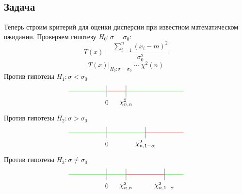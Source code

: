 \documentclass[12pt, a4paper]{article}
\begin{document}
\subsection*{Задача}
Теперь строим критерий для оценки дисперсии при известном математическом ожидании. Проверяем гипотезу $H_0: \sigma = \sigma_0$:
\[T(x) = \frac{\sum_{i = 1}^{n} (x_i - m)^2}{\sigma_0^2}\]
\[T(x) \big|_{H_0: \sigma = \sigma_0} \sim \chi^2(n)\]
Против гипотезы $H_1: \sigma < \sigma_0$
\[\begin{tikzpicture}[scale=2]
    \draw[green] (-1, 0) -- (0, 0);
    \draw[red] (0, 0) -- (0.5, 0);
    \draw[green] (0.5, 0) -- (2, 0);
    \draw (0, -0.15) -- ++(0, 0.3);
    \node at (0, -0.3) (a) {$0$};
    \draw (0.5, -0.15) -- ++(0, 0.3);
    \node at (0.5, -0.3) (a) {$\chi^2_{n, \alpha}$};
\end{tikzpicture}\]
Против гипотезы $H_2: \sigma > \sigma_0$
\[\begin{tikzpicture}[scale=2]
    \draw[green] (-1, 0) -- (0, 0);
    \draw[green] (0, 0) -- (1, 0);
    \draw[red] (1, 0) -- (2, 0);
    \draw (0, -0.15) -- ++(0, 0.3);
    \node at (0, -0.3) (a) {$0$};
    \draw (1, -0.15) -- ++(0, 0.3);
    \node at (1, -0.3) (a) {$\chi^2_{n, 1 - \alpha}$};
\end{tikzpicture}\]
Против гипотезы $H_3: \sigma \neq \sigma_0$
\[\begin{tikzpicture}[scale=2]
    \draw[green] (-1, 0) -- (0, 0);
    \draw[green] (0, 0) -- (0.5, 0);
    \draw[green] (1.5, 0) -- ++(0.5, 0);
    \draw[red] (0.5, 0) -- (1.5, 0);
    \draw (0, -0.15) -- ++(0, 0.3);
    \node at (0, -0.3) (a) {$0$};
    \draw (0.5, -0.15) -- ++(0, 0.3);
    \draw (1.5, -0.15) -- ++(0, 0.3);
    \node at (0.5, -0.3) (a) {$\chi^2_{n, \alpha}$};
    \node at (1.5, -0.3) (a) {$\chi^2_{n, 1 - \alpha}$};
\end{tikzpicture}\]
\end{document}
